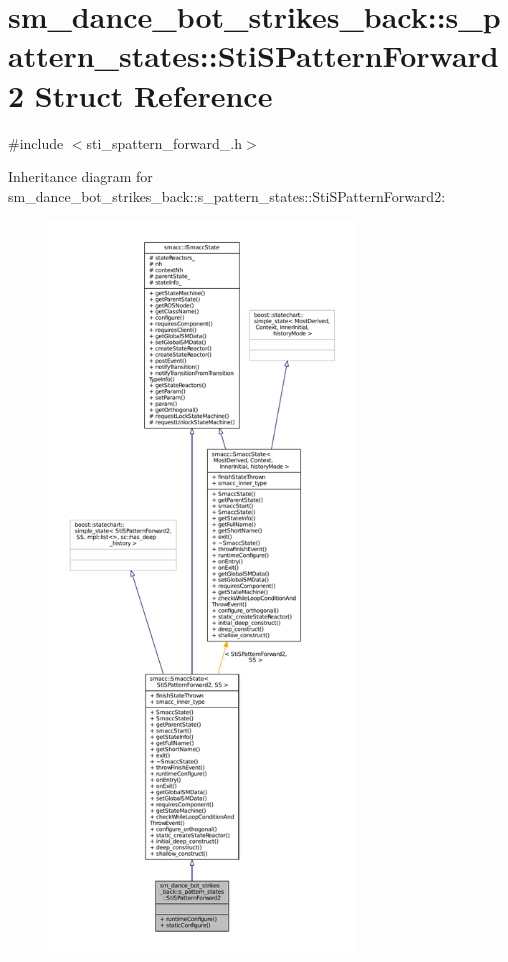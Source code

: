 \hypertarget{structsm__dance__bot__strikes__back_1_1s__pattern__states_1_1StiSPatternForward2}{}\section{sm\+\_\+dance\+\_\+bot\+\_\+strikes\+\_\+back\+:\+:s\+\_\+pattern\+\_\+states\+:\+:Sti\+S\+Pattern\+Forward2 Struct Reference}
\label{structsm__dance__bot__strikes__back_1_1s__pattern__states_1_1StiSPatternForward2}


{\ttfamily \#include $<$sti\+\_\+spattern\+\_\+forward\+\_.\+h$>$}



Inheritance diagram for sm\+\_\+dance\+\_\+bot\+\_\+strikes\+\_\+back\+:\+:s\+\_\+pattern\+\_\+states\+:\+:Sti\+S\+Pattern\+Forward2\+:
\nopagebreak
\begin{figure}[H]
\begin{center}
\leavevmode
\includegraphics[height=550pt]{structsm__dance__bot__strikes__back_1_1s__pattern__states_1_1StiSPatternForward2__inherit__graph}
\end{center}
\end{figure}


